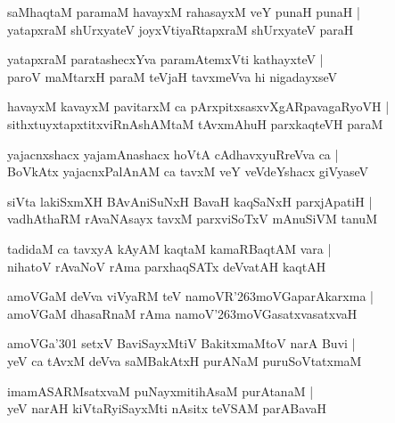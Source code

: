 \documentclass[twoside,12pt,openright]{book}
\def\S{\char'263}
\newcounter{shloka}[chapter]
\begin{document}
\begin{shloka}%
saMhaqtaM paramaM havayxM rahasayxM veY punaH punaH |\\
yatapxraM shUrxyateV joyxVtiyaRtapxraM shUrxyateV paraH 
\end{shloka}

\begin{shloka}%
yatapxraM paratashecxYva paramAtemxVti kathayxteV |\\
paroV maMtarxH paraM teVjaH tavxmeVva hi nigadayxseV 
\end{shloka}

\begin{shloka}%
havayxM kavayxM pavitarxM ca pArxpitxsasxvXgARpavagaRyoVH |\\
sithxtuyxtapxtitxviRnAshAMtaM tAvxmAhuH parxkaqteVH paraM 
\end{shloka}

\begin{shloka}%
yajacnxshacx yajamAnashacx hoVtA cAdhavxyuRreVva ca |\\
BoVkAtx yajacnxPalAnAM ca tavxM veY veVdeYshacx giVyaseV 
\end{shloka}

\begin{shloka}%
siVta lakiSxmXH BAvAniSuNxH BavaH kaqSaNxH parxjApatiH |\\
vadhAthaRM rAvaNAsayx tavxM parxviSoTxV mAnuSiVM tanuM 
\end{shloka}

\begin{shloka}%
tadidaM ca tavxyA kAyAM kaqtaM kamaRBaqtAM vara |\\
nihatoV rAvaNoV rAma parxhaqSATx deVvatAH kaqtAH 
\end{shloka}

\begin{shloka}%
amoVGaM deVva viVyaRM teV namoVR\S moVGaparAkarxma |\\
amoVGaM dhasaRnaM rAma namoV\S moVGasatxvasatxvaH 
\end{shloka}

\begin{shloka}%
amoVGa\char'301 setxV BaviSayxMtiV BakitxmaMtoV narA Buvi |\\
yeV ca tAvxM deVva saMBakAtxH purANaM puruSoVtatxmaM 
\end{shloka}

\begin{shloka}%
imamASARMsatxvaM puNayxmitihAsaM purAtanaM |\\
yeV narAH kiVtaRyiSayxMti nAsitx teVSAM parABavaH 
\end{shloka}
\end{document}
